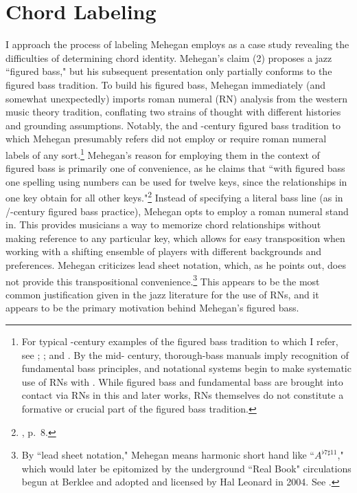 \section{Chord Labeling}
I approach the process of labeling Mehegan employs as a case study revealing the difficulties of determining chord identity.  Mehegan's claim (2) proposes a jazz ``figured bass," but his subsequent presentation only partially conforms to the figured bass tradition.  To build his figured bass, Mehegan immediately (and somewhat unexpectedly) imports roman numeral (RN) analysis from the western music theory tradition, conflating two strains of thought with different histories and grounding assumptions.  Notably, the  and -century figured bass tradition to which Mehegan presumably refers did not employ or require roman numeral labels of any sort.\footnote{For typical -century examples of the figured bass tradition to which I refer, see \cite{heinichen1711}; \cite{heinichen1728}; and \cite{mattheson1739}.  By the mid- century, thorough-bass manuals imply recognition of fundamental bass principles, and notational systems begin to make systematic use of RNs with \cite{vogler1776}.  While figured bass and fundamental bass are brought into contact via RNs in this and later works, RNs themselves do not constitute a formative or crucial part of the figured bass tradition.}  Mehegan's reason for employing them in the context of figured bass is primarily one of convenience, as he claims that ``with figured bass one spelling using numbers can be used for twelve keys, since the relationships in one key obtain  for all other keys."\footnote{\cite{mehegan1959}, p.\ 8.}  Instead of specifying a literal bass line (as in /-century figured bass practice), Mehegan opts to employ a roman numeral stand in.  This provides musicians a way to memorize chord relationships without making reference to any particular key, which allows for easy transposition when working with a shifting ensemble of players with different backgrounds and preferences.  Mehegan criticizes lead sheet notation, which, as he points out, does not provide this transpositional convenience.\footnote{By ``lead sheet notation," Mehegan means harmonic short hand like ``$A^{\flat 7 \sharp 11}$," which would later be epitomized by the underground ``Real Book" circulations begun at Berklee and adopted and licensed by Hal Leonard in 2004.  See \cite{realbook}.}  This appears to be the most common justification given in the jazz literature for the use of RNs, and it appears to be the primary motivation behind Mehegan's figured bass.

